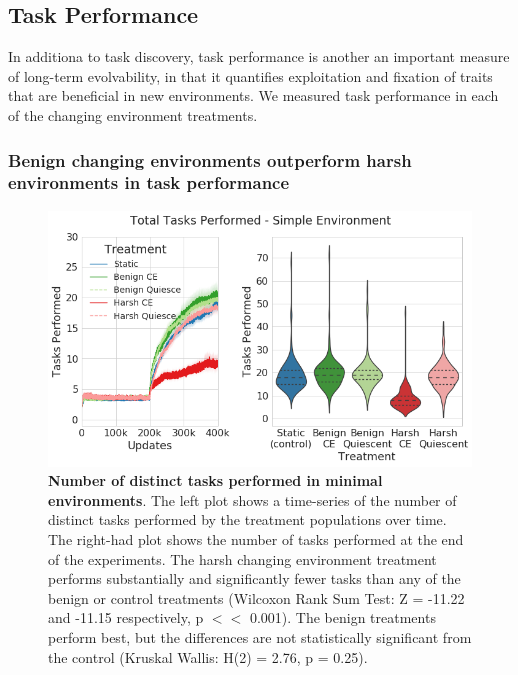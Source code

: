 \documentclass[PhD]{msu-thesis}
\begin{document}







\subsection{Task Performance}
In additiona to task discovery, task performance is another an important measure of long-term evolvability, in that it quantifies exploitation and fixation of traits that are beneficial in new environments. We measured task performance in each of the changing environment treatments.

\subsubsection{Benign changing environments outperform harsh environments in task performance}

	\begin{figure}[!h]
	\includegraphics[width=0.95\columnwidth]{figures/LTE/lte-simple-task_performance.png}
	\caption{\textbf{Number of distinct tasks performed in minimal environments}. The left plot shows a time-series of the number of distinct tasks performed by the treatment populations over time. The right-had plot shows the number of tasks performed at the end of the experiments. The harsh changing environment treatment performs substantially and significantly fewer tasks than any of the benign or control treatments (Wilcoxon Rank Sum Test: Z = -11.22 and -11.15 respectively, p $<<$ 0.001). The benign treatments perform best, but the differences are not statistically significant from the control (Kruskal Wallis: H(2) = 2.76, p = 0.25). %
	}
	\label{fig:lte-simple-task_performance}
	\end{figure}  
\end{document}

